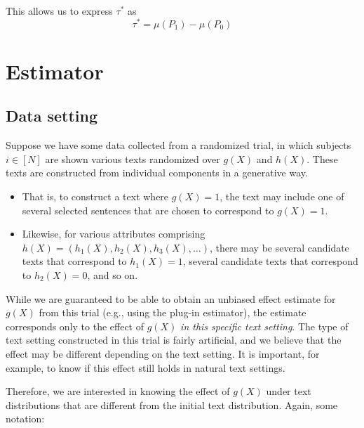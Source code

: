 \documentclass{article}
\begin{document}
	This allows us to express $\tau^*$ as
	\begin{equation*}
		\boxed{\tau^* = \mu(P_1)-\mu(P_0)}
	\end{equation*}
	
	\section{Estimator}
	
	\subsection{Data setting}
	
	Suppose we have some data collected from a randomized trial, in which subjects $i \in [N]$ are shown various texts randomized over $g(X)$ and $h(X)$. These texts are constructed from individual components in a generative way. 
	\begin{itemize}
		\item That is, to construct a text where $g(X)=1$, the text may include one of several selected sentences that are chosen to correspond to $g(X)=1$.
		\item Likewise, for various attributes comprising $h(X)=(h_1(X), h_2(X), h_3(X), \dots)$, there may be several candidate texts that correspond to $h_1(X)=1$, several candidate texts that correspond to $h_2(X)=0$, and so on.
	\end{itemize}
	
	While we are guaranteed to be able to obtain an unbiased effect estimate for $g(X)$ from this trial (e.g., using the plug-in estimator), the estimate corresponds only to the effect of $g(X)$ \textit{in this specific text setting}. The type of text setting constructed in this trial is fairly artificial, and we believe that the effect may be different depending on the text setting. It is important, for example, to know if this effect still holds in natural text settings.
	
	Therefore, we are interested in knowing the effect of $g(X)$ under text distributions that are different from the initial text distribution. Again, some notation:
	
\end{document}
